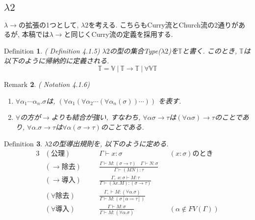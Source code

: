 \documentclass[11pt]{jsreport}
\theoremstyle{mystyle}
\newtheorem{df}{$\textrm{Definition}$}[subsection]
\newtheorem{rmk}[df]{$\textrm{Remark}$}
\newcommand{\T}{\mathbb{T}}
\newcommand{\V}{\mathbb{V}}
\newcommand{\lama}{\lambda \! \! \to}
\newcommand{\0}{\textbf{0}}
\newcommand{\1}{\textbf{1}}
\newcommand{\2}{\textbf{2}}
\begin{document}
\subsection*{$\lambda 2$}
$\lama$の拡張の1つとして, $\lambda 2$を考える. こちらもCurry流とChurch流の2通りがあるが, 本稿では$\lama$と同じくCurry流の定義を採用する. 
\begin{shadebox}
  \begin{df}{(\cite{Bar} Definition 4.1.5)}
    $\lambda 2$の型の集合Type($\lambda 2$)を$\T$と書く. 
    このとき, $\T$は以下のように帰納的に定義される. 
    \[
      \T = \V \ |\ \T \to \T \ |\ \forall \V \T
    \]
  \end{df}
\end{shadebox}
\begin{rmk}{(\cite{Bar} Notation 4.1.6)}
  \begin{enumerate}
    \item $\forall \alpha_1 \cdots \alpha_n . \sigma$は, 
             $(\forall \alpha_1(\forall \alpha_2 \cdots (\forall \alpha_n (\sigma))\cdots))$
             を表す. 
    \item $\forall$の方が$\to$よりも結合が強い, すなわち, 
             $\forall \alpha \sigma \to \tau$は$(\forall \alpha \sigma) \to \tau$のことであり, 
             $\forall \alpha . \sigma \to \tau$は$\forall \alpha (\sigma \to \tau)$のことである.
  \end{enumerate}
\end{rmk}
\begin{shadebox}
  \begin{df}
    $\lambda 2$の型導出規則を, 以下のように定める.
    \begin{alignat*}{3}
      &(\text{公理})& \quad &\Gamma \vdash x \colon \sigma& 
        &(x \colon \sigma)\text{のとき}\\
      &(\text{$\to$除去})& 
        &\frac{\Gamma \vdash M \colon (\sigma \to \tau) \quad
          \Gamma \vdash N \colon \sigma}{\Gamma \vdash (MN) \colon \tau}& & \\
      &(\text{$\to$導入})& &\frac{\Gamma,\ x \colon \sigma \vdash M \colon \tau}
        {\Gamma \vdash (\lambda x . M) \colon (\sigma \to \tau)}& & \\
      &(\text{$\forall$除去})& &\frac{\Gamma, \vdash M \colon (\forall \alpha . \sigma)}
        {\Gamma \vdash M \colon (\sigma[\alpha \coloneqq \tau])}& & \\
      &(\text{$\forall$導入})& &\frac{\Gamma \vdash M \colon \sigma}
        {\Gamma \vdash M \colon (\forall \alpha . \sigma)}& &(\alpha \notin FV(\Gamma))
    \end{alignat*}
  \end{df}
\end{shadebox}
\end{document}
